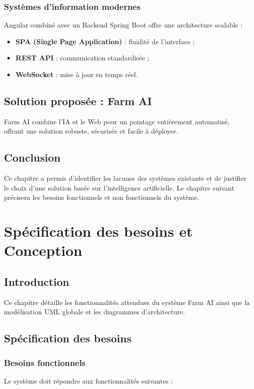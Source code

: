 \documentclass[12pt,a4paper]{report}
\numberwithin{figure}{chapter}
\numberwithin{table}{chapter}
\begin{document}
\subsection{Systèmes d'information modernes}
Angular combiné avec un Backend Spring Boot offre une architecture scalable :
\begin{itemize}
  \item \textbf{SPA (Single Page Application)} : fluidité de l'interface ;
  \item \textbf{REST API} : communication standardisée ;
  \item \textbf{WebSocket} : mise à jour en temps réel.
\end{itemize}

\section{Solution proposée : Farm AI}
Farm AI combine l'IA et le Web pour un pointage entièrement automatisé, offrant une solution
robuste, sécurisée et facile à déployer.

\section{Conclusion}
Ce chapitre a permis d'identifier les lacunes des systèmes existants et de justifier le choix
d'une solution basée sur l'intelligence artificielle. Le chapitre suivant précisera les besoins
fonctionnels et non fonctionnels du système.

\chapter{Spécification des besoins et Conception}

\section{Introduction}
Ce chapitre détaille les fonctionnalités attendues du système Farm AI ainsi que la modélisation
UML globale et les diagrammes d'architecture.

\section{Spécification des besoins}

\subsection{Besoins fonctionnels}
Le système doit répondre aux fonctionnalités suivantes :
\end{document}
